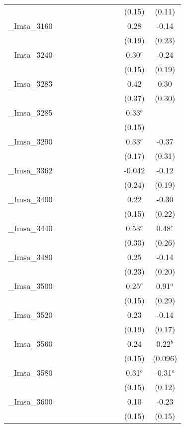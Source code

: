 \documentclass[]{article}
\begin{document}
\begin{tabular}{lcccccccccc}
 &  &  &  &  &  &  &  &  & (0.15) & (0.11) \\
\_Imsa\_3160 &  &  &  &  &  &  &  &  & 0.28 & -0.14 \\
 &  &  &  &  &  &  &  &  & (0.19) & (0.23) \\
\_Imsa\_3240 &  &  &  &  &  &  &  &  & 0.30$^c$ & -0.24 \\
 &  &  &  &  &  &  &  &  & (0.15) & (0.19) \\
\_Imsa\_3283 &  &  &  &  &  &  &  &  & 0.42 & 0.30 \\
 &  &  &  &  &  &  &  &  & (0.37) & (0.30) \\
\_Imsa\_3285 &  &  &  &  &  &  &  &  & 0.33$^b$ &  \\
 &  &  &  &  &  &  &  &  & (0.15) &  \\
\_Imsa\_3290 &  &  &  &  &  &  &  &  & 0.33$^c$ & -0.37 \\
 &  &  &  &  &  &  &  &  & (0.17) & (0.31) \\
\_Imsa\_3362 &  &  &  &  &  &  &  &  & -0.042 & -0.12 \\
 &  &  &  &  &  &  &  &  & (0.24) & (0.19) \\
\_Imsa\_3400 &  &  &  &  &  &  &  &  & 0.22 & -0.30 \\
 &  &  &  &  &  &  &  &  & (0.15) & (0.22) \\
\_Imsa\_3440 &  &  &  &  &  &  &  &  & 0.53$^c$ & 0.48$^c$ \\
 &  &  &  &  &  &  &  &  & (0.30) & (0.26) \\
\_Imsa\_3480 &  &  &  &  &  &  &  &  & 0.25 & -0.14 \\
 &  &  &  &  &  &  &  &  & (0.23) & (0.20) \\
\_Imsa\_3500 &  &  &  &  &  &  &  &  & 0.25$^c$ & 0.91$^a$ \\
 &  &  &  &  &  &  &  &  & (0.15) & (0.29) \\
\_Imsa\_3520 &  &  &  &  &  &  &  &  & 0.23 & -0.14 \\
 &  &  &  &  &  &  &  &  & (0.19) & (0.17) \\
\_Imsa\_3560 &  &  &  &  &  &  &  &  & 0.24 & 0.22$^b$ \\
 &  &  &  &  &  &  &  &  & (0.15) & (0.096) \\
\_Imsa\_3580 &  &  &  &  &  &  &  &  & 0.31$^b$ & -0.31$^a$ \\
 &  &  &  &  &  &  &  &  & (0.15) & (0.12) \\
\_Imsa\_3600 &  &  &  &  &  &  &  &  & 0.10 & -0.23 \\
 &  &  &  &  &  &  &  &  & (0.15) & (0.15) \\

\end{tabular}
\end{document}
